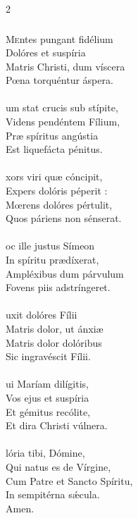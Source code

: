 \documentclass[9pt,twoside]{extarticle}
\begin{document}
\begin{multicols}{2}
{\subsubsection*{\center {}}
\lettrine{M}entes pungant fidélium\\
Dolóres et suspíria\\
Matris Christi, dum víscera\\
Pœna torquéntur áspera.\\
\\
um stat crucis sub stípite,\\
Videns pendéntem Fílium,\\
Præ spíritus angústia\\
Est liquefácta pénitus.\\
\\
xors viri quæ cóncipit,\\
Expers dolóris péperit :\\
Mœrens dolóres pértulit,\\
Quos páriens non sénserat.\\
\\
oc ille justus Símeon\\
In spíritu prædíxerat,\\
Ampléxibus dum párvulum\\
Fovens piis adstríngeret.\\
\\
uxit dolóres Fílii\\
Matris dolor, ut ánxiæ\\
Matris dolor dolóribus\\
Sic ingravéscit Fílii.\\
\\
ui Maríam dilígitis,\\
Vos ejus et suspíria\\
Et gémitus recólite,\\
Et dira Christi vúlnera.\\
\\
lória tibi, Dómine,\\
Qui natus es de Vírgine,\\
Cum Patre et Sancto Spíritu,\\
In sempitérna sǽcula.\\
Amen.

}
\end{multicols}
\end{document}

